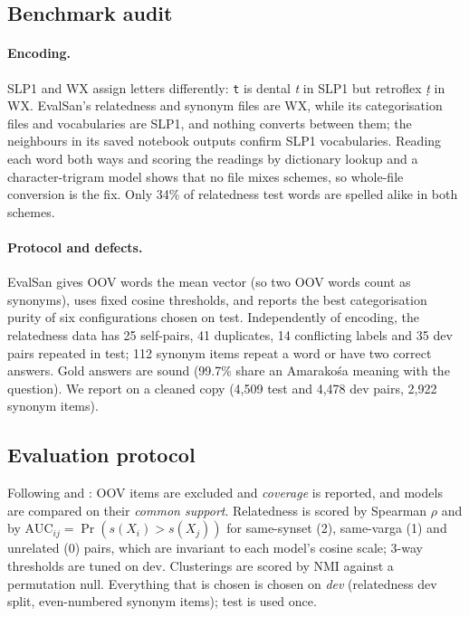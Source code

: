 \documentclass[11pt]{article}
\begin{document}
\subsection{Benchmark audit}\label{sec:audit}
\paragraph{Encoding.} SLP1 and WX assign letters differently: \texttt{t} is
dental \emph{t} in SLP1 but retroflex \emph{ṭ} in WX. EvalSan's
relatedness and synonym files are WX, while its categorisation files and
vocabularies are SLP1, and nothing converts between them; the neighbours in
its saved notebook outputs confirm SLP1 vocabularies. Reading each word both
ways and scoring the readings by dictionary lookup and a character-trigram
model shows that no file mixes schemes, so whole-file conversion is the fix.
Only 34\% of relatedness test words are spelled alike in both schemes.

\paragraph{Protocol and defects.} EvalSan gives OOV words the mean vector
(so two OOV words count as synonyms), uses fixed cosine thresholds, and
reports the best categorisation purity of six configurations chosen on test.
Independently of encoding, the relatedness data has 25 self-pairs, 41
duplicates, 14 conflicting labels and 35 dev pairs repeated in test; 112
synonym items repeat a word or have two correct answers. Gold answers are
sound (99.7\% share an Amarakośa meaning with the question). We report on a
cleaned copy (4,509 test and 4,478 dev pairs, 2,922 synonym items).

\subsection{Evaluation protocol}\label{sec:protocol}
Following \citet{schnabel2015evaluation} and \citet{faruqui2016problems}:
OOV items are excluded and \emph{coverage} is reported, and models are
compared on their \emph{common support}. Relatedness is scored by Spearman
$\rho$ and by $\mathrm{AUC}_{ij}=\Pr(s(X_i)>s(X_j))$ for same-synset (2),
same-varga (1) and unrelated (0) pairs, which are invariant to each model's
cosine scale; 3-way thresholds are tuned on dev. Clusterings are scored by
NMI against a permutation null. Everything that is chosen is chosen on
\emph{dev} (relatedness dev split, even-numbered synonym items); test is
used once.
\end{document}
